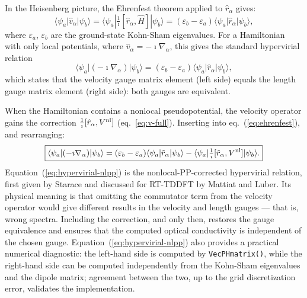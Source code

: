 In the Heisenberg picture, the Ehrenfest theorem applied to
$\hat{r}_\alpha$ gives:
\begin{equation}
  \langle\psi_a|\hat{v}_\alpha|\psi_b\rangle
  = \langle\psi_a|\tfrac{1}{\imath}[\hat{r}_\alpha,\hat{H}]
    |\psi_b\rangle
  = (\varepsilon_b - \varepsilon_a)
    \langle\psi_a|\hat{r}_\alpha|\psi_b\rangle,
  \label{eq:ehrenfest}
\end{equation}
where $\varepsilon_a$, $\varepsilon_b$ are the ground-state
Kohn-Sham eigenvalues.
For a Hamiltonian with only local potentials, where $\hat{v}_\alpha
= -\imath\nabla_\alpha$, this gives the standard hypervirial relation
\begin{equation}
  \langle\psi_a|(-\imath\nabla_\alpha)|\psi_b\rangle
  = (\varepsilon_b - \varepsilon_a)
    \langle\psi_a|\hat{r}_\alpha|\psi_b\rangle,
  \label{eq:hypervirial-local}
\end{equation}
which states that the velocity gauge matrix element (left side)
equals the length gauge matrix element (right side): both gauges
are equivalent.

When the Hamiltonian contains a nonlocal pseudopotential, the
velocity operator gains the correction
$\frac{1}{\imath}[\hat{r}_\alpha,V^{\mathrm{nl}}]$
(eq.~\ref{eq:v-full}).
Inserting into eq.~(\ref{eq:ehrenfest}), and rearranging:
\begin{equation}
  \boxed{
  \langle\psi_a|(-\imath\nabla_\alpha)|\psi_b\rangle
  = (\varepsilon_b - \varepsilon_a)
    \langle\psi_a|\hat{r}_\alpha|\psi_b\rangle
  - \langle\psi_a|\tfrac{1}{\imath}
    [\hat{r}_\alpha,V^{\mathrm{nl}}]|\psi_b\rangle.
  }
  \label{eq:hypervirial-nlpp}
\end{equation}
Equation~(\ref{eq:hypervirial-nlpp}) is the nonlocal-PP-corrected
hypervirial relation, first given by Starace\cite{starace-1971} and
discussed for RT-TDDFT by Mattiat and
Luber.\cite{Mattiat-Luber-2022}
Its physical meaning is that omitting the commutator term from the
velocity operator would give different results in the velocity and
length gauges — that is, wrong spectra.
Including the correction, and only then, restores the gauge
equivalence and ensures that the computed optical conductivity is
independent of the chosen gauge.
Equation~(\ref{eq:hypervirial-nlpp}) also provides a practical
numerical diagnostic: the left-hand side is computed by
\texttt{VecPHmatrix()}, while the right-hand side can be computed
independently from the Kohn-Sham eigenvalues and the dipole matrix;
agreement between the two, up to the grid discretization error,
validates the implementation.

